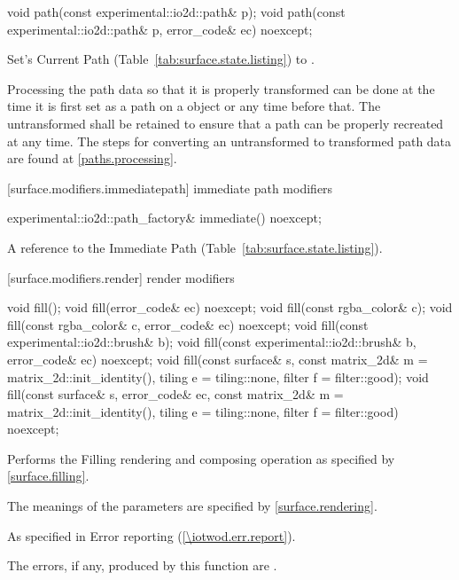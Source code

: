 \begin{itemdecl}
void path(const experimental::io2d::path& p);
void path(const experimental::io2d::path& p, error_code& ec) noexcept;
\end{itemdecl}
\begin{itemdescr}
\pnum
\effects
Set's Current Path (Table~\ref{tab:surface.state.listing}) to .

\pnum
\remarks
Processing the path data so that it is properly transformed can be done at the time it is first set as a path on a  object or any time before that. The untransformed  shall be retained to ensure that a path can be properly recreated at any time. The steps for converting an untransformed  to transformed path data are found at \ref{paths.processing}.
\end{itemdescr}

 [surface.modifiers.immediatepath] { immediate path modifiers}

\begin{itemdecl}
experimental::io2d::path_factory& immediate() noexcept;
\end{itemdecl}
\begin{itemdescr}
\pnum
\returns
A reference to the Immediate Path (Table~\ref{tab:surface.state.listing}).
\end{itemdescr}

 [surface.modifiers.render] { render modifiers}

\begin{itemdecl}
void fill();
void fill(error_code& ec) noexcept;
void fill(const rgba_color& c);
void fill(const rgba_color& c, error_code& ec) noexcept;
void fill(const experimental::io2d::brush& b);
void fill(const experimental::io2d::brush& b, error_code& ec) noexcept;
void fill(const surface& s, const matrix_2d& m = matrix_2d::init_identity(), 
  tiling e = tiling::none, filter f = filter::good);
void fill(const surface& s, error_code& ec,
  const matrix_2d& m = matrix_2d::init_identity(), tiling e = tiling::none, 
  filter f = filter::good) noexcept;
\end{itemdecl}
\begin{itemdescr}
\pnum
\effects
Performs the Filling rendering and composing operation as specified by \ref{surface.filling}.

\pnum
The meanings of the parameters are specified by \ref{surface.rendering}.

\pnum
\throws
As specified in Error reporting (\ref{\iotwod.err.report}).

\pnum
\errors
The errors, if any, produced by this function are .
\end{itemdescr}

